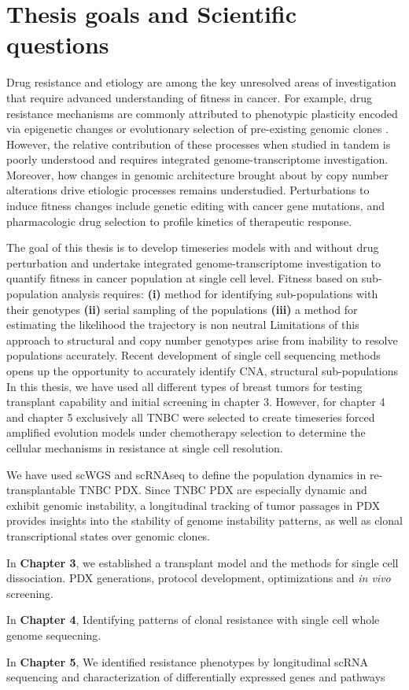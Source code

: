 \section{Thesis goals and Scientific questions}
Drug resistance and etiology are among the key unresolved areas of investigation that require advanced understanding of fitness in cancer. For example, drug resistance mechanisms are commonly attributed to phenotypic plasticity encoded via epigenetic changes \cite{shaffer2017rare,sun2014reversible} or evolutionary selection of pre-existing genomic clones \cite{vasan2019view}. However, the relative contribution of these processes when  studied  in  tandem  is  poorly  understood  and  requires  integrated  genome-transcriptome investigation.   Moreover,  how  changes  in  genomic  architecture  brought  about  by  copy  number alterations drive etiologic processes remains understudied. Perturbations to induce fitness changes include genetic editing with cancer gene mutations, and pharmacologic drug selection to profile kinetics of therapeutic response.

The goal of this thesis is to develop timeseries models with and without  drug perturbation and undertake integrated  genome-transcriptome investigation to quantify fitness in cancer population at single cell level. 
Fitness based on sub-population analysis requires:
\textbf{(i)} method for identifying sub-populations with their genotypes
\textbf{(ii)} serial sampling of the populations
\textbf{(iii)} a method for estimating the likelihood the trajectory is non neutral
Limitations of this approach to structural and copy number genotypes arise from inability to resolve populations accurately.
Recent development of single cell sequencing methods opens up the opportunity to accurately identify \ac{CNA}, structural sub-populations
In this thesis, we have used all different types of breast tumors for testing transplant capability and initial screening in chapter 3.  However, for chapter 4 and chapter 5 exclusively all \ac{TNBC} were selected to create timeseries forced amplified evolution models under chemotherapy selection to determine the cellular mechanisms in resistance  at single cell resolution.

 We have used \ac{scWGS} and \ac{scRNAseq} to define the population dynamics in re-transplantable TNBC PDX.
 Since TNBC PDX are especially dynamic and exhibit genomic instability, a longitudinal tracking of tumor passages in PDX provides insights into the stability of genome instability patterns, as well as clonal transcriptional states over genomic clones.
 
 In \textbf{Chapter 3}, we established a transplant model and the methods for single cell dissociation. PDX generations, protocol development, optimizations and \textit{in vivo} screening. 
 
 In \textbf{Chapter 4}, Identifying patterns of clonal resistance with single cell whole genome sequecning. 
 
 In \textbf{Chapter 5}, We identified resistance phenotypes by longitudinal scRNA sequencing and characterization of differentially  expressed genes and pathways 


